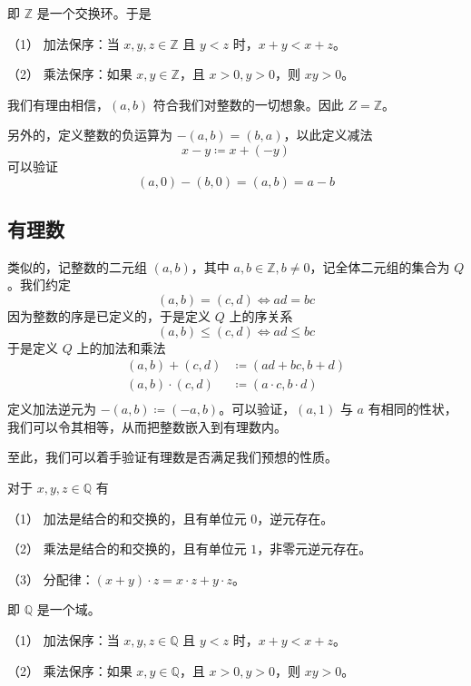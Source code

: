 即 $\mathbb{Z}$ 是一个交换环。于是

\begin{theorem}
	（1） 加法保序：当 $x,y,z\in \mathbb{Z}$ 且 $y<z$ 时，$x+y<x+z$。

	（2） 乘法保序：如果 $x,y\in \mathbb{Z}$，且 $x>0,y>0$，则 $xy>0$。
\end{theorem}

我们有理由相信，$(a,b)$ 符合我们对整数的一切想象。因此 $Z = \mathbb{Z}$。

另外的，定义整数的负运算为 $-(a,b) = (b,a)$，以此定义减法
\[ x - y \coloneqq  x + (-y)\]
可以验证
\[ (a,0) - (b,0) = (a,b) = a - b\]

\subsection{有理数}

类似的，记整数的二元组 $(a,b)$，其中 $a,b\in \mathbb{Z},b\ne 0$，记全体二元组的集合为 $Q$。我们约定
\[ (a,b) = (c,d) \Leftrightarrow ad = bc\]
因为整数的序是已定义的，于是定义 $Q$ 上的序关系
\[ (a,b) \leqslant (c,d) \Leftrightarrow ad \leqslant bc\]
于是定义 $Q$ 上的加法和乘法
\[
	\begin{aligned}
		(a,b) + (c,d)     & \coloneqq  (ad+bc,b+d)           \\
		(a,b) \cdot (c,d) & \coloneqq  (a \cdot c,b \cdot d) \\
	\end{aligned}
\]
定义加法逆元为 $-(a,b) \coloneqq  (-a,b)$。可以验证，$(a,1)$ 与 $a$ 有相同的性状，我们可以令其相等，从而把整数嵌入到有理数内。

至此，我们可以着手验证有理数是否满足我们预想的性质。

\begin{theorem}
	对于 $x,y,z\in \mathbb{Q}$ 有

	（1） 加法是结合的和交换的，且有单位元 $0$，逆元存在。

	（2） 乘法是结合的和交换的，且有单位元 $1$，非零元逆元存在。

	（3） 分配律：$(x+y) \cdot  z = x \cdot z + y\cdot z$。
\end{theorem}

即 $\mathbb{Q}$ 是一个域。

\begin{theorem}
	（1） 加法保序：当 $x,y,z\in \mathbb{Q}$ 且 $y<z$ 时，$x+y<x+z$。

	（2） 乘法保序：如果 $x,y\in \mathbb{Q}$，且 $x>0,y>0$，则 $xy>0$。
\end{theorem}

